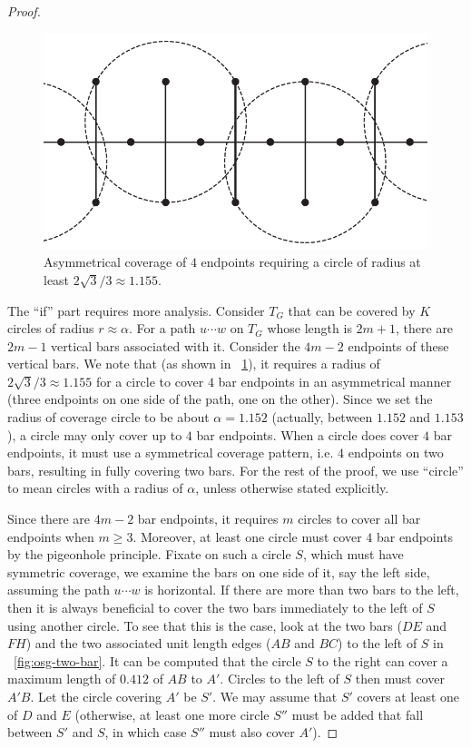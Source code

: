 \begin{proof}
  \begin{figure}[!ht]
    \centering
    \includegraphics[scale=0.33]{chapters/osg/figures/edgepath3-eps-converted-to.pdf}
  \vspace*{1mm}
    \caption{Asymmetrical coverage of $4$ endpoints requiring a circle of 
    radius at least $2\sqrt{3}/3\approx 1.155$.}
    \label{fig:osg-pathcovert}
  \end{figure}

The ``if'' part requires more analysis. Consider $T_G$ that can be covered 
by $K$ circles of radius $r \approx \alpha$. For a path $u\cdots w$ on $T_G$ whose 
length is $2m+1$, there are $2m-1$ vertical bars associated with it. Consider 
the $4m-2$ endpoints of these vertical bars. We note that (as shown in 
~\ref{fig:osg-pathcovert}), it requires a radius of $2\sqrt{3}/3\approx 1.155$ 
for a circle to cover $4$ bar endpoints in an asymmetrical manner (three endpoints
on one side of the path, one on the other). Since 
we set the radius of coverage circle to be about $\alpha = 1.152$ (actually, 
between $1.152$ and $1.153$),
a circle may only cover up to $4$ bar endpoints. When a circle does cover $4$ 
bar endpoints, it must use a symmetrical coverage pattern, i.e. $4$ endpoints
on two bars, resulting in fully covering two bars. For the 
rest of the proof, we use ``circle'' to mean circles with a radius of $\alpha$,
unless otherwise stated explicitly. 

Since there are $4m - 2$ bar endpoints, it requires $m$ circles to cover all 
bar endpoints when $m \ge 3$. Moreover, at least one circle must cover $4$ 
bar endpoints by the pigeonhole principle. Fixate on such a circle $S$, which 
must have symmetric coverage, we examine the bars on one side of it, say the 
left side, assuming the path $u\cdots w$ is horizontal. If there are more 
than two bars to the left, then it is always beneficial to cover the two bars 
immediately to the left of $S$ using another circle. To see that this is the 
case, look at the two bars ($DE$ and $FH$) and the two associated unit 
length edges ($AB$ and $BC$) to the left of $S$ in ~\ref{fig:osg-two-bar}.
It can be computed that the circle $S$ to the right can cover a maximum 
length of $0.412$ of $AB$ to $A'$. Circles to the left of $S$ then must cover 
$A'B$. Let the circle covering $A'$ be $S'$. We may assume that 
$S'$ covers at least one of $D$ and $E$ (otherwise, at least one more circle 
$S''$ must be added that fall between $S'$ and $S$, in which case $S''$ 
must also cover $A'$). 


\end{proof}
